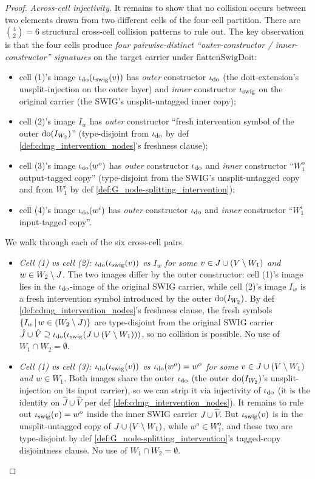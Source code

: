 \documentclass[main]{subfiles}
\providecommand{\flattenSwigDoit}{\mathrm{flattenSwigDoit}}
\begin{document}
\begin{proof}
\smallskip\noindent\emph{Across-cell injectivity.}
It remains to show that no collision occurs between two elements drawn from two different cells of the four-cell partition. There are $\binom{4}{2} = 6$ structural cross-cell collision patterns to rule out. The key observation is that the four cells produce \emph{four pairwise-distinct ``outer-constructor / inner-constructor'' signatures} on the target carrier under $\flattenSwigDoit$:
\begin{itemize}
    \item cell (1)'s image $\iota_{\operatorname{do}}(\iota_{\mathrm{swig}}(v))$ has \emph{outer} constructor $\iota_{\operatorname{do}}$ (the doit-extension's unsplit-injection on the outer layer) and \emph{inner} constructor $\iota_{\mathrm{swig}}$ on the original carrier (the SWIG's unsplit-untagged inner copy);
    \item cell (2)'s image $I_w$ has \emph{outer} constructor ``fresh intervention symbol of the outer $\operatorname{do}(I_{W_2})$'' (type-disjoint from $\iota_{\operatorname{do}}$ by def \ref{def:cdmg_intervention_nodes}'s freshness clause);
    \item cell (3)'s image $\iota_{\operatorname{do}}(w^o)$ has \emph{outer} constructor $\iota_{\operatorname{do}}$ and \emph{inner} constructor ``$W_1^o$ output-tagged copy'' (type-disjoint from the SWIG's unsplit-untagged copy and from $W_1^i$ by def \ref{def:G_node-splitting_intervention});
    \item cell (4)'s image $\iota_{\operatorname{do}}(w^i)$ has \emph{outer} constructor $\iota_{\operatorname{do}}$ and \emph{inner} constructor ``$W_1^i$ input-tagged copy''.
\end{itemize}
We walk through each of the six cross-cell pairs.
\begin{itemize}
    \item \emph{Cell (1) vs cell (2): $\iota_{\operatorname{do}}(\iota_{\mathrm{swig}}(v))$ vs $I_{w}$ for some $v \in J \cup (V \setminus W_1)$ and $w \in W_2 \setminus J$.} The two images differ by the outer constructor: cell (1)'s image lies in the $\iota_{\operatorname{do}}$-image of the original SWIG carrier, while cell (2)'s image $I_w$ is a fresh intervention symbol introduced by the outer $\operatorname{do}(I_{W_2})$. By def \ref{def:cdmg_intervention_nodes}'s freshness clause, the fresh symbols $\left \{ I_w \,\middle|\, w \in (W_2 \setminus J) \right \}$ are type-disjoint from the original SWIG carrier $\hat J \cup \hat V \supseteq \iota_{\operatorname{do}}(\iota_{\mathrm{swig}}(J \cup (V \setminus W_1)))$, so no collision is possible. No use of $W_1 \cap W_2 = \emptyset$.
    \item \emph{Cell (1) vs cell (3): $\iota_{\operatorname{do}}(\iota_{\mathrm{swig}}(v))$ vs $\iota_{\operatorname{do}}(w^o) = w^o$ for some $v \in J \cup (V \setminus W_1)$ and $w \in W_1$.} Both images share the outer $\iota_{\operatorname{do}}$ (the outer $\operatorname{do}(I_{W_2})$'s unsplit-injection on its input carrier), so we can strip it via injectivity of $\iota_{\operatorname{do}}$ (it is the identity on $\hat J \cup \hat V$ per def \ref{def:cdmg_intervention_nodes}). It remains to rule out $\iota_{\mathrm{swig}}(v) = w^o$ inside the inner SWIG carrier $\hat J \cup \hat V$. But $\iota_{\mathrm{swig}}(v)$ is in the unsplit-untagged copy of $J \cup (V \setminus W_1)$, while $w^o \in W_1^o$, and these two are type-disjoint by def \ref{def:G_node-splitting_intervention}'s tagged-copy disjointness clause. No use of $W_1 \cap W_2 = \emptyset$.

\end{itemize}
\end{proof}
\end{document}
